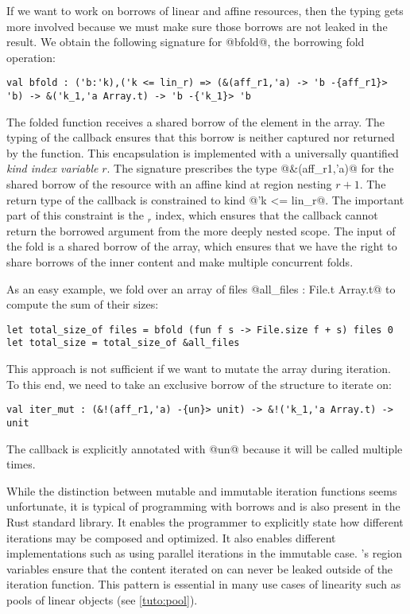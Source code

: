 If we want to work on borrows of linear and affine resources, then the
typing gets more involved because
we must make sure those borrows are not leaked in the result.
We obtain the following signature for @bfold@, the borrowing fold operation:
\begin{lstlisting}[numbers=none]
val bfold : ('b:'k),('k <= lin_r) => (&(aff_r1,'a) -> 'b -{aff_r1}> 'b) -> &('k_1,'a Array.t) -> 'b -{'k_1}> 'b
\end{lstlisting}

The folded function receives a shared borrow of the element in the array.
The typing of the callback ensures
that this borrow is neither captured nor returned by the function.
%
This encapsulation is implemented with a universally quantified \emph{kind index variable} $r$.
The signature prescribes the type @&(aff_r1,'a)@ for the
shared borrow of the resource with an affine kind at region nesting $r+1$. The return
type of the callback is constrained to kind @'k <= lin_r@. The
important part of this constraint is the $_r$ index, which ensures
that the callback cannot return the borrowed argument from the more
deeply nested scope. 
%
The input of the fold is a shared borrow of the array,
which ensures that we have the right to share borrows of the inner content and
make multiple concurrent folds.

As an easy example, we fold over an array of files
@all_files : File.t Array.t@ to compute the sum of their sizes:
\begin{lstlisting}[numbers=none]
let total_size_of files = bfold (fun f s -> File.size f + s) files 0
let total_size = total_size_of &all_files
\end{lstlisting}

This approach is not sufficient if we want to mutate the array during iteration.
To this end, we need to take an exclusive borrow of the structure to iterate
on:
\begin{lstlisting}[numbers=none]
val iter_mut : (&!(aff_r1,'a) -{un}> unit) -> &!('k_1,'a Array.t) -> unit
\end{lstlisting}

The callback is explicitly annotated with @un@ because  it will be called multiple times.

While the distinction between mutable and immutable iteration functions
seems unfortunate, it is typical of
programming with borrows and is also present in the Rust standard library.
It enables the programmer to explicitly state how different iterations
may be composed and optimized.
It also enables different implementations such as
using parallel iterations in the immutable case.
\lang's region variables ensure that the content iterated on can never
be leaked outside of the iteration function.
This pattern is essential in many use cases of linearity such
as pools of linear objects (see \cref{tuto:pool}).

